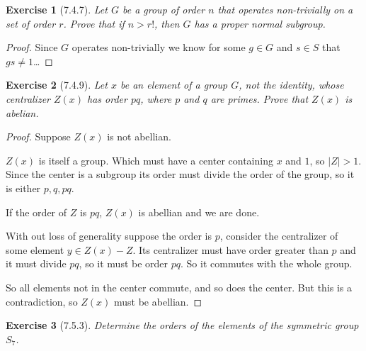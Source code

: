 \documentclass[12pt]{article}
\newtheorem*{exer}{Exercise}
\begin{document}

\begin{exer}[7.4.7]

    Let $G$ be a group of order $n$ that operates non-trivially on a set
    of order $r$. Prove that if $n > r!$, then $G$ has a proper normal
    subgroup.

\end{exer}

\begin{proof}

    Since $G$ operates non-trivially we know for some $g \in G$ and $s
    \in S$ that $gs \neq 1$\dots

\end{proof}


\begin{exer}[7.4.9]

    Let $x$ be an element of a group $G$, not the identity, whose
    centralizer $Z(x)$ has order $pq$, where $p$ and $q$ are primes.
    Prove that $Z(x)$ is abelian.

\end{exer}

\begin{proof}

    Suppose $Z(x)$ is not abellian. 

    $Z(x)$ is itself a group. Which must have a center containing $x$
    and $1$, so $|Z| > 1$. Since the center is a subgroup its order must
    divide the order of the group, so it is either $p, q, pq$. 

    If the order of $Z$ is $pq$, $Z(x)$ is abellian and we are done.

    With out loss of generality suppose the order is $p$, consider
    the centralizer of some element $y \in Z(x) - Z$. Its centralizer
    must have order greater than $p$ and it must divide $pq$, so it must
    be order $pq$. So it commutes with the whole group. 

    So all elements not in the center commute, and so does the center.
    But this is a contradiction, so $Z(x)$ must be abellian.

\end{proof}


\begin{exer}[7.5.3]

    Determine the orders of the elements of the symmetric group $S_7$.

\end{exer}
\end{document}
